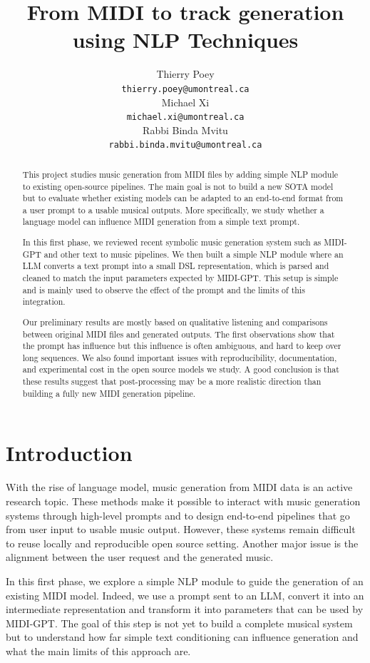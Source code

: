 \documentclass[11pt]{article}
\title{From MIDI to track generation using NLP Techniques}
\author{Thierry Poey \\ 
\texttt{thierry.poey@umontreal.ca} \\\And
  Michael Xi \\ 
  \texttt{michael.xi@umontreal.ca} \\\And
  Rabbi Binda Mvitu \\
  \texttt{rabbi.binda.mvitu@umontreal.ca} 
  }
\begin{document}
\maketitle

\begin{abstract}
This project studies music generation from MIDI files by adding simple NLP module to existing open-source pipelines. The main goal is not to build a new SOTA model but to evaluate whether existing models can be adapted to an end-to-end format from a user prompt to a usable musical outputs. More specifically, we study whether a language model can influence MIDI generation from a simple text prompt.

In this first phase, we reviewed recent symbolic music generation system such as MIDI-GPT and other text to music pipelines. We then built a simple NLP module where an LLM converts a text prompt into a small DSL representation, which is parsed and cleaned to match the input parameters expected by MIDI-GPT. This setup is simple and is mainly used to observe the effect of the prompt and the limits of this integration.

Our preliminary results are mostly based on qualitative listening and comparisons between original MIDI files and generated outputs. The first observations show that the prompt has influence but this influence is often ambiguous, and hard to keep over long sequences. We also found important issues with reproducibility, documentation, and experimental cost in the open source models we study. A good conclusion is that these results suggest that post-processing may be a more realistic direction than building a fully new MIDI generation pipeline.
\end{abstract}

\section{Introduction}

With the rise of language model, music generation from MIDI data is an active research topic. These methods make it possible to interact with music generation systems through high-level prompts and to design end-to-end pipelines that go from user input to usable music output. However, these systems remain difficult to reuse locally and reproducible open source setting. Another major issue is the alignment between the user request and the generated music.

In this first phase, we explore a simple NLP module to guide the generation of an existing MIDI model. Indeed, we use a prompt sent to an LLM, convert it into an intermediate representation and transform it into parameters that can be used by MIDI-GPT. The goal of this step is not yet to build a complete musical system but to understand how far simple text conditioning can influence generation and what the main limits of this approach are.
\end{document}
